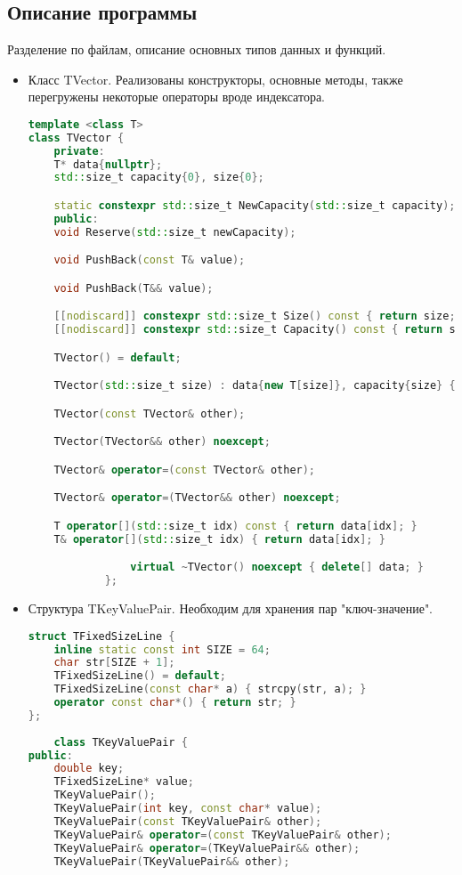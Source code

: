 \documentclass[12pt]{article}
\begin{document}
\subsection*{Описание программы}

Разделение по файлам, описание основных типов данных и функций. \\
\begin{itemize}
    \item
        Класс TVector. Реализованы конструкторы, основные методы, также перегружены некоторые операторы вроде индексатора.
        \begin{lstlisting}[language=C++]
template <class T>
class TVector {
    private:
    T* data{nullptr};
    std::size_t capacity{0}, size{0};

    static constexpr std::size_t NewCapacity(std::size_t capacity);
    public:
    void Reserve(std::size_t newCapacity);

    void PushBack(const T& value);

    void PushBack(T&& value);

    [[nodiscard]] constexpr std::size_t Size() const { return size; }
    [[nodiscard]] constexpr std::size_t Capacity() const { return size; }

    TVector() = default;

    TVector(std::size_t size) : data{new T[size]}, capacity{size} {}

    TVector(const TVector& other);

    TVector(TVector&& other) noexcept;

    TVector& operator=(const TVector& other);

    TVector& operator=(TVector&& other) noexcept;

    T operator[](std::size_t idx) const { return data[idx]; }
    T& operator[](std::size_t idx) { return data[idx]; }

                virtual ~TVector() noexcept { delete[] data; }
            };
        \end{lstlisting}
    \item
        Структура TKeyValuePair. Необходим для хранения пар "ключ-значение".
        \begin{lstlisting}[language=C++]
struct TFixedSizeLine {
    inline static const int SIZE = 64;
    char str[SIZE + 1];
    TFixedSizeLine() = default;
    TFixedSizeLine(const char* a) { strcpy(str, a); }
    operator const char*() { return str; }
};
        
    class TKeyValuePair {
public:
    double key;
    TFixedSizeLine* value;
    TKeyValuePair();
    TKeyValuePair(int key, const char* value);
    TKeyValuePair(const TKeyValuePair& other);
    TKeyValuePair& operator=(const TKeyValuePair& other);
    TKeyValuePair& operator=(TKeyValuePair&& other);
    TKeyValuePair(TKeyValuePair&& other);


\end{lstlisting}
\end{itemize}
\end{document}
